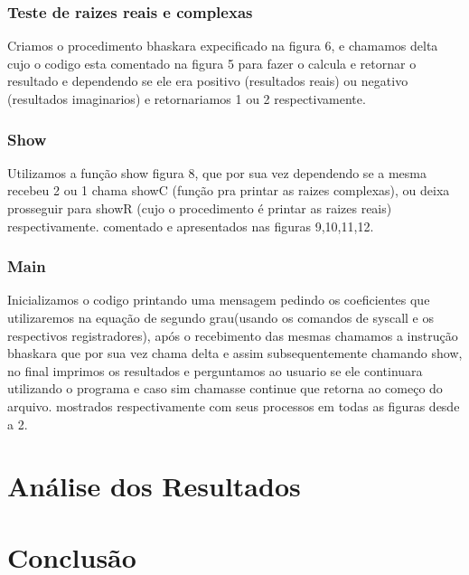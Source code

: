 \documentclass[12pt]{article}
\begin{document}
\subsubsection{Teste de raizes reais e complexas}
\label{subsubsec:testebhas}

Criamos o procedimento bhaskara expecificado na figura 6, e chamamos delta cujo o codigo esta comentado na figura 5 para fazer o calcula e retornar o resultado e dependendo se ele era positivo (resultados reais) ou negativo (resultados imaginarios) e retornariamos 1 ou 2 respectivamente. 

\subsubsection{Show}
\label{subsubsec:show}

Utilizamos a função show figura 8, que por sua vez dependendo se a mesma recebeu 2 ou 1 chama showC (função pra printar as raizes complexas), ou deixa prosseguir para showR (cujo o procedimento é printar as raizes reais) respectivamente. comentado e apresentados nas figuras 9,10,11,12. 

\subsubsection{Main}
\label{subsubsec:Main}

Inicializamos o codigo printando uma mensagem pedindo os coeficientes que utilizaremos na equação de segundo grau(usando os comandos de syscall e os respectivos registradores), após o recebimento das mesmas chamamos a instrução bhaskara que por sua vez chama delta e assim subsequentemente chamando show, no final imprimos os resultados e perguntamos ao usuario se ele continuara utilizando o programa e caso sim chamasse continue que retorna ao começo do arquivo. mostrados respectivamente com seus processos em todas as figuras desde a 2.
 
	

\section{Análise dos Resultados}
\label{sec:Resultados}

\section{Conclusão}
\label{sec:Conclusao}



\end{document}
